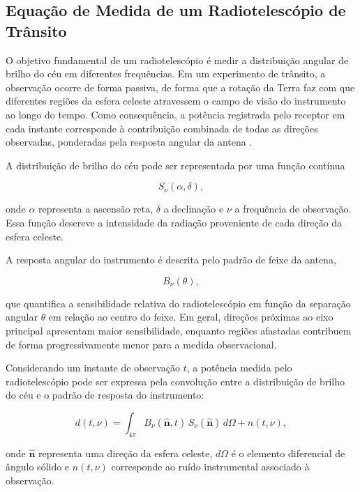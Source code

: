 \subsection{Equação de Medida de um Radiotelescópio de Trânsito}

O objetivo fundamental de um radiotelescópio é medir a distribuição angular de brilho do céu em diferentes frequências. Em um experimento de trânsito, a observação ocorre de forma passiva, de forma que a rotação da Terra faz com que diferentes regiões da esfera celeste atravessem o campo de visão do instrumento ao longo do tempo. Como consequência, a potência registrada pelo receptor em cada instante corresponde à contribuição combinada de todas as direções observadas, ponderadas pela resposta angular da antena \cite{thompson2017interferometry, wilson2013tools}.

A distribuição de brilho do céu pode ser representada por uma função contínua

\begin{equation}
S_\nu(\alpha,\delta),
\end{equation}

onde \(\alpha\) representa a ascensão reta, \(\delta\) a declinação e \(\nu\) a frequência de observação. Essa função descreve a intensidade da radiação proveniente de cada direção da esfera celeste.

A resposta angular do instrumento é descrita pelo padrão de feixe da antena,

\begin{equation}
B_\nu(\theta),
\end{equation}

que quantifica a sensibilidade relativa do radiotelescópio em função da separação angular \(\theta\) em relação ao centro do feixe. Em geral, direções próximas ao eixo principal apresentam maior sensibilidade, enquanto regiões afastadas contribuem de forma progressivamente menor para a medida observacional.

Considerando um instante de observação \(t\), a potência medida pelo radiotelescópio pode ser expressa pela convolução entre a distribuição de brilho do céu e o padrão de resposta do instrumento:

\begin{equation}
d(t,\nu) =
\int_{4\pi}
B_\nu(\hat{\mathbf n},t)\,
S_\nu(\hat{\mathbf n})\,
d\Omega
+
n(t,\nu),
\label{eq:measurement_equation}
\end{equation}

onde \(\hat{\mathbf n}\) representa uma direção da esfera celeste, \(d\Omega\) é o elemento diferencial de ângulo sólido e \(n(t,\nu)\) corresponde ao ruído instrumental associado à observação.

